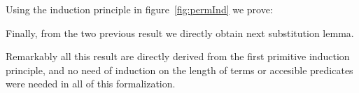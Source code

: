 \documentclass{article}
\begin{document}
Using the induction principle in figure~\ref{fig:permInd} we prove:

 \hspace{5px}

Finally, from the two previous result we directly obtain next substitution lemma.

 \hspace{5px}

Remarkably all this result are directly derived from the first primitive induction principle, and no need of induction on the length of terms or accesible predicates were needed in all of this formalization.

\end{document}
